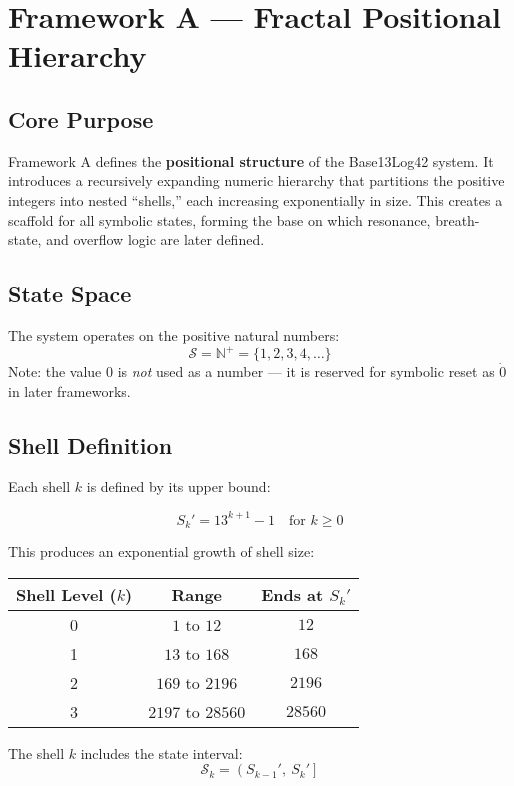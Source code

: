 \section*{Framework A — Fractal Positional Hierarchy}

\subsection*{Core Purpose}

Framework A defines the \textbf{positional structure} of the Base13Log42 system. It introduces a recursively expanding numeric hierarchy that partitions the positive integers into nested “shells,” each increasing exponentially in size. This creates a scaffold for all symbolic states, forming the base on which resonance, breath-state, and overflow logic are later defined.

\subsection*{State Space}

The system operates on the positive natural numbers:
\[
\mathcal{S} = \mathbb{N}^+ = \{1, 2, 3, 4, \dots\}
\]
Note: the value $0$ is \emph{not} used as a number — it is reserved for symbolic reset as $\dot{0}$ in later frameworks.

\subsection*{Shell Definition}

Each shell $k$ is defined by its upper bound:

\[
S_k' = 13^{k+1} - 1 \quad \text{for } k \geq 0
\]

This produces an exponential growth of shell size:

\begin{center}
\begin{tabular}{|c|c|c|}
\hline
\textbf{Shell Level ($k$)} & \textbf{Range} & \textbf{Ends at $S_k'$} \\
\hline
0 & $1$ to $12$ & $12$ \\
1 & $13$ to $168$ & $168$ \\
2 & $169$ to $2196$ & $2196$ \\
3 & $2197$ to $28560$ & $28560$ \\
\hline
\end{tabular}
\end{center}

The shell $k$ includes the state interval:
\[
\mathcal{S}_k = \left(S_{k-1}',\ S_k'\right]
\]


